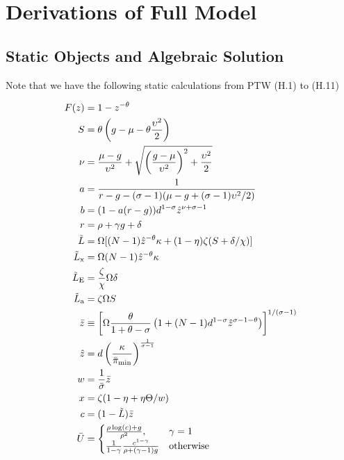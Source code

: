 \documentclass[11pt]{article}
\begin{document}
\section{Derivations of Full Model}\label{sec:full-model-derivations}

\subsection{Static Objects and Algebraic Solution}\label{sec:full-algebraic-solution}

Note that we have the following static calculations from PTW (H.1) to (H.11)

\begin{align}
	F(z) &= 1 - z^{-\theta} \\
	S &= \theta \left(g - \mu - \theta \frac{\upsilon^2}{2}\right) \\
	\nu &= \frac{\mu - g}{\upsilon^2} + \sqrt{\left(\frac{g - \mu}{\upsilon^2}\right)^2 + \frac{\upsilon^2}{2}} \\
	a &= \frac{1}{r - g - (\sigma - 1)(\mu - g  + (\sigma - 1)\upsilon^2/2)} \\
	b &= (1 - a(r-g))d^{1-\sigma}\hat{z}^{\nu + \sigma -1} \\
	r &= \rho + \gamma g + \delta \\
	\tilde{L} &= \Omega [(N-1)\hat{z}^{-\theta}\kappa + (1-\eta)\zeta(S + \delta/\chi)] \\
	\tilde{L}_{\text{x}} &= \Omega (N -1)\hat{z}^{-\theta}\kappa\\
	\tilde{L}_{\text{E}} &= \frac{\zeta}{\chi}\Omega\delta\\
	\tilde{L}_{\text{a}} &= \zeta \Omega S\\
	\bar{z}&\equiv \left[\Omega
	\frac{\theta}{1+\theta - \sigma}\left(1 + (N-1)d^{1-\sigma}\hat{z}^{\sigma - 1 -\theta} \right)\right]^{1/(\sigma - 1)} \\
	\hat{z} &= d \left(\frac{\kappa}{\bar{\pi}_{\textup{min}}}\right)^{\frac{1}{\sigma - 1}} \\
	w &= \frac{1}{\bar{\sigma}}\bar{z} \\
	x &= \zeta(1 - \eta + \eta \Theta / w) \\
		c &= (1 - \tilde{L})\bar{z} \\
		\bar{U} &=
	\begin{cases}
	\frac{\rho \log(c) + g}{\rho^2}, & \gamma = 1 \\
	\frac{1}{1-\gamma} \frac{c^{1 - \gamma}}{\rho + (\gamma - 1)g} & \text{otherwise}
	\end{cases}
\end{align}
\end{document}
